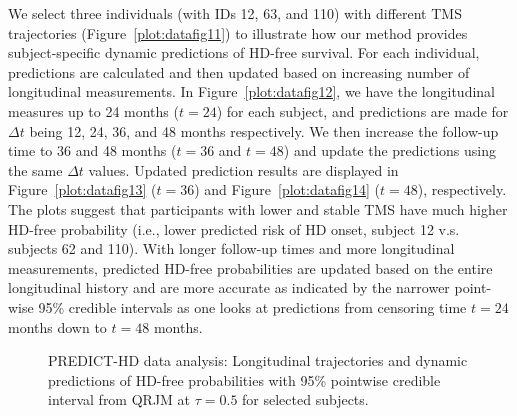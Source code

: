 We select three individuals (with IDs 12, 63, and 110) with different TMS trajectories (Figure~\ref{plot:datafig11}) to illustrate how our method provides subject-specific dynamic predictions of HD-free survival. For each individual, predictions are calculated and then updated based on increasing number of longitudinal measurements. In Figure~\ref{plot:datafig12}, we have the longitudinal measures up to 24 months ($t=24$) for each subject, and predictions are made for $\Delta t$ being 12, 24, 36, and 48 months respectively. We then increase the follow-up time to 36 and 48 months ($t=36$ and $t=48$) and update the predictions using the same $\Delta t$ values. Updated prediction results are displayed in Figure~\ref{plot:datafig13} ($t=36$) and Figure~\ref{plot:datafig14} ($t=48$), respectively. The plots suggest that participants with lower and stable TMS have much higher HD-free probability (i.e., lower predicted risk of HD onset, subject 12 v.s. subjects 62 and 110). With longer follow-up times and more longitudinal measurements, predicted HD-free probabilities are updated based on the entire longitudinal history and are more accurate as indicated by the narrower point-wise 95\% credible intervals as one looks at predictions from censoring time $t=24$ months down to $t=48$ months.

\begin{figure}[H]

{}



  \caption{PREDICT-HD data analysis: Longitudinal trajectories and dynamic predictions of HD-free probabilities with 95\% pointwise credible interval from QRJM at $\tau=0.5$ for selected subjects.}
  \label{plot:datafig1}
\end{figure}



% 
